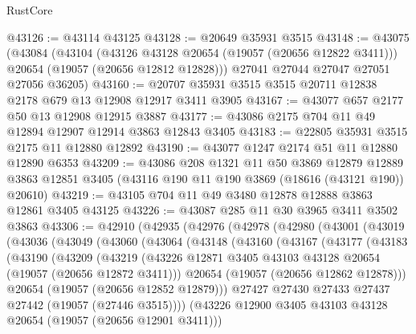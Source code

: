 \begin{lexlean}{RustCore}
\begin{coremodule}
@43126 := @43114 @43125
@43128 := @20649 @35931 @3515
@43148 := @43075
    (@43084
      (@43104
        (@43126 @43128 @20654 (@19057 (@20656 @12822 @3411)))
        @20654
        (@19057 (@20656 @12812 @12828)))
      @27041
      @27044
      @27047
      @27051
      @27056
      @36205)
@43160 := @20707 @35931 @3515 @3515 @20711 @12838 @2178 @679 @13 @12908 @12917 @3411 @3905
@43167 := @43077 @657 @2177 @50 @13 @12908 @12915 @3887
@43177 := @43086 @2175 @704 @11 @49 @12894 @12907 @12914 @3863 @12843 @3405
@43183 := @22805 @35931 @3515 @2175 @11 @12880 @12892
@43190 := @43077 @1247 @2174 @51 @11 @12880 @12890 @6353
@43209 := @43086
    @208
    @1321
    @11
    @50
    @3869
    @12879
    @12889
    @3863
    @12851
    @3405
    (@43116 @190 @11 @190 @3869 (@18616 (@43121 @190)) @20610)
@43219 := @43105 @704 @11 @49 @3480 @12878 @12888 @3863 @12861 @3405 @43125
@43226 := @43087 @285 @11 @30 @3965 @3411 @3502 @3863
@43306 := @42910
    (@42935
      (@42976
        (@42978
          (@42980
            (@43001
              (@43019
                (@43036
                  (@43049
                    (@43060
                      (@43064
                        (@43148
                          (@43160
                            (@43167
                              (@43177
                                (@43183
                                  (@43190
                                    (@43209
                                      (@43219
                                        (@43226
                                          @12871
                                          @3405
                                          @43103
                                          @43128
                                          @20654
                                          (@19057 (@20656 @12872 @3411)))
                                        @20654
                                        (@19057 (@20656 @12862 @12878)))
                                      @20654
                                      (@19057 (@20656 @12852 @12879)))
                                    @27427
                                    @27430
                                    @27433
                                    @27437
                                    @27442
                                    (@19057 (@27446 @3515))))
                                (@43226
                                  @12900
                                  @3405
                                  @43103
                                  @43128
                                  @20654
                                  (@19057 (@20656 @12901 @3411)))

\end{coremodule}
\end{lexlean}
